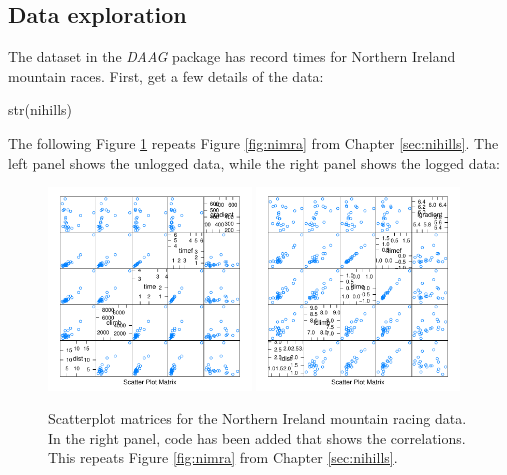 \subsection*{Data exploration}

The dataset  in the {\em DAAG} package has
record times for Northern Ireland mountain races.  First, get a few
details of the data:
\begin{fullwidth}
\begin{Schunk}
\begin{Sinput}
str(nihills)
\end{Sinput}
\end{Schunk}
\end{fullwidth}

The following Figure \ref{fig:nimra-reg} repeats Figure
\ref{fig:nimra} from Chapter \ref{sec:nihills}.
The left panel shows the unlogged data, while the
right panel shows the logged data:
\begin{figure}
\vspace*{-6pt}
\begin{Schunk}


\centerline{\includegraphics[width=0.48\textwidth]{figs/8-splot2-ni-1} \includegraphics[width=0.48\textwidth]{figs/8-splot2-ni-2} }

\end{Schunk}
\caption{Scatterplot matrices for the Northern Ireland mountain racing
  data. In the right panel, code has been added that shows the
  correlations.
This repeats Figure \ref{fig:nimra} from Chapter \ref{sec:nihills}.
\label{fig:nimra-reg}}
\end{figure}


